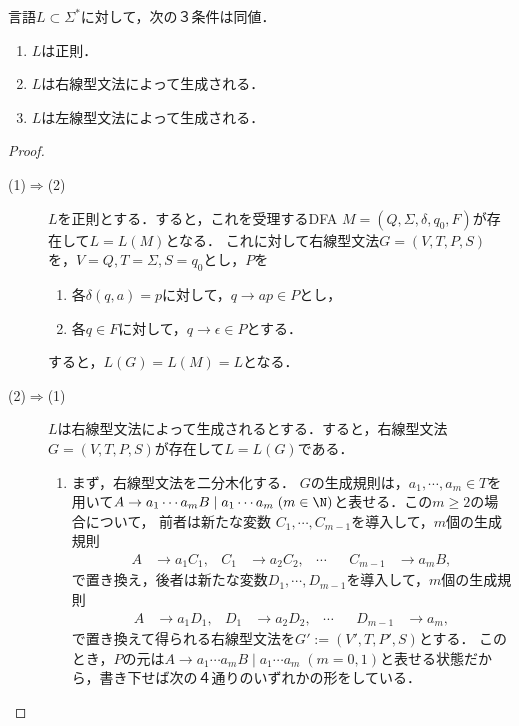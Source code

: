 \begin{theorem}[正則言語の特徴付け]\label{thm-characterization-of-regular-language-as-CFL}
    言語$L\subset\Sigma^*$に対して，次の３条件は同値．
    \begin{enumerate}
        \item $L$は正則．
        \item $L$は右線型文法によって生成される．
        \item $L$は左線型文法によって生成される．
    \end{enumerate}
\end{theorem}
\begin{proof}\mbox{}
    \begin{description}
        \item[(1)$\Rightarrow$(2)] 
        $L$を正則とする．すると，これを受理するDFA $M=(Q,\Sigma,\delta,q_0,F)$が存在して$L=L(M)$となる．
        これに対して右線型文法$G=(V,T,P,S)$を，$V=Q,T=\Sigma,S=q_0$とし，$P$を
        \begin{enumerate}
            \item 各$\delta(q,a)=p$に対して，$q\to ap\in P$とし，
            \item 各$q\in F$に対して，$q\to\epsilon\in P$とする．
        \end{enumerate}
        すると，$L(G)=L(M)=L$となる．
        \item[(2)$\Rightarrow$(1)] 
        $L$は右線型文法によって生成されるとする．すると，右線型文法$G=(V,T,P,S)$が存在して$L=L(G)$である．
        \begin{enumerate}
            \item まず，右線型文法を二分木化する．
            $G$の生成規則は，$a_1,\cdots,a_m\in T$を用いて$A\to a_1\cdots a_mB\mid a_1\cdots a_m\;(m\in\N)$と表せる．この$m\ge 2$の場合について，
            前者は新たな変数
            $C_1,\cdots,C_{m-1}$を導入して，$m$個の生成規則
            \begin{align*}
                A&\to a_1C_1,&C_1&\to a_2C_2,&\cdots&&C_{m-1}&\to a_mB,
            \end{align*}
            で置き換え，後者は新たな変数$D_1,\cdots,D_{m-1}$を導入して，$m$個の生成規則
            \begin{align*}
                A&\to a_1D_1,&D_1&\to a_2D_2,&\cdots&&D_{m-1}&\to a_m,
            \end{align*}
            で置き換えて得られる右線型文法を$G':=(V',T,P',S)$とする．
            このとき，$P$の元は$A\to a_1\cdots a_mB\mid a_1\cdots a_m\;(m=0,1)$と表せる状態だから，書き下せば次の４通りのいずれかの形をしている．

\end{enumerate}
\end{description}
\end{proof}
